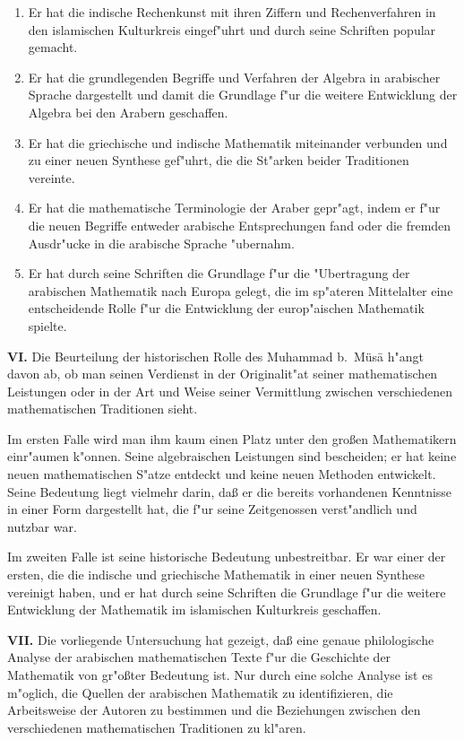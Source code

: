 \documentclass[11pt,a4paper]{article}
\begin{document}
\begin{enumerate}
\item Er hat die indische Rechenkunst mit ihren Ziffern und Rechenverfahren in den islamischen Kulturkreis eingef"uhrt und durch seine Schriften popular gemacht.
\item Er hat die grundlegenden Begriffe und Verfahren der Algebra in arabischer Sprache dargestellt und damit die Grundlage f"ur die weitere Entwicklung der Algebra bei den Arabern geschaffen.
\item Er hat die griechische und indische Mathematik miteinander verbunden und zu einer neuen Synthese gef"uhrt, die die St"arken beider Traditionen vereinte.
\item Er hat die mathematische Terminologie der Araber gepr"agt, indem er f"ur die neuen Begriffe entweder arabische Entsprechungen fand oder die fremden Ausdr"ucke in die arabische Sprache "ubernahm.
\item Er hat durch seine Schriften die Grundlage f"ur die "Ubertragung der arabischen Mathematik nach Europa gelegt, die im sp"ateren Mittelalter eine entscheidende Rolle f"ur die Entwicklung der europ"aischen Mathematik spielte.
\end{enumerate}

\textbf{VI.} Die Beurteilung der historischen Rolle des Muhammad b.\ M\"us\=a h"angt davon ab, ob man seinen Verdienst in der Originalit"at seiner mathematischen Leistungen oder in der Art und Weise seiner Vermittlung zwischen verschiedenen mathematischen Traditionen sieht.

Im ersten Falle wird man ihm kaum einen Platz unter den gro\ss{}en Mathematikern einr"aumen k"onnen. Seine algebraischen Leistungen sind bescheiden; er hat keine neuen mathematischen S"atze entdeckt und keine neuen Methoden entwickelt. Seine Bedeutung liegt vielmehr darin, da\ss{} er die bereits vorhandenen Kenntnisse in einer Form dargestellt hat, die f"ur seine Zeitgenossen verst"andlich und nutzbar war.

Im zweiten Falle ist seine historische Bedeutung unbestreitbar. Er war einer der ersten, die die indische und griechische Mathematik in einer neuen Synthese vereinigt haben, und er hat durch seine Schriften die Grundlage f"ur die weitere Entwicklung der Mathematik im islamischen Kulturkreis geschaffen.

\textbf{VII.} Die vorliegende Untersuchung hat gezeigt, da\ss{} eine genaue philologische Analyse der arabischen mathematischen Texte f"ur die Geschichte der Mathematik von gr"o\ss{}ter Bedeutung ist. Nur durch eine solche Analyse ist es m"oglich, die Quellen der arabischen Mathematik zu identifizieren, die Arbeitsweise der Autoren zu bestimmen und die Beziehungen zwischen den verschiedenen mathematischen Traditionen zu kl"aren.
\end{document}
